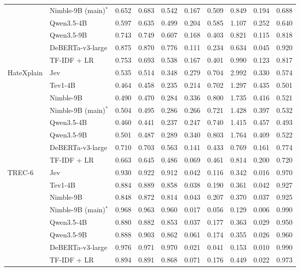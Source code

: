 \begin{tabular}{llrrrrrrrr}
 & Nimble-9B (main)$^\ast$ & 0.652 & 0.683 & 0.542 & 0.167 & 0.509 & 0.849 & 0.194 & 0.688 \\
 & Qwen3.5-4B & 0.597 & 0.635 & 0.499 & 0.204 & 0.585 & 1.107 & 0.252 & 0.640 \\
 & Qwen3.5-9B & 0.743 & 0.749 & 0.607 & 0.168 & 0.403 & 0.821 & 0.115 & 0.818 \\
 & DeBERTa-v3-large & 0.875 & 0.870 & 0.776 & 0.111 & 0.234 & 0.634 & 0.045 & 0.920 \\
 & TF-IDF + LR & 0.753 & 0.693 & 0.538 & 0.167 & 0.401 & 0.990 & 0.123 & 0.817 \\
\midrule
HateXplain & Jev & 0.535 & 0.514 & 0.348 & 0.279 & 0.704 & 2.992 & 0.330 & 0.574 \\
 & Tev1-4B & 0.464 & 0.458 & 0.235 & 0.214 & 0.702 & 1.297 & 0.435 & 0.501 \\
 & Nimble-9B & 0.490 & 0.470 & 0.284 & 0.336 & 0.800 & 1.735 & 0.416 & 0.521 \\
 & Nimble-9B (main)$^\ast$ & 0.504 & 0.495 & 0.286 & 0.266 & 0.721 & 1.428 & 0.397 & 0.532 \\
 & Qwen3.5-4B & 0.460 & 0.441 & 0.237 & 0.247 & 0.740 & 1.415 & 0.457 & 0.493 \\
 & Qwen3.5-9B & 0.501 & 0.487 & 0.289 & 0.340 & 0.803 & 1.764 & 0.409 & 0.522 \\
 & DeBERTa-v3-large & 0.710 & 0.703 & 0.563 & 0.141 & 0.433 & 0.769 & 0.161 & 0.774 \\
 & TF-IDF + LR & 0.663 & 0.645 & 0.486 & 0.069 & 0.461 & 0.814 & 0.200 & 0.720 \\
\midrule
TREC-6 & Jev & 0.930 & 0.922 & 0.912 & 0.042 & 0.116 & 0.342 & 0.016 & 0.970 \\
 & Tev1-4B & 0.884 & 0.889 & 0.858 & 0.038 & 0.190 & 0.361 & 0.042 & 0.927 \\
 & Nimble-9B & 0.848 & 0.872 & 0.814 & 0.043 & 0.207 & 0.370 & 0.037 & 0.925 \\
 & Nimble-9B (main)$^\ast$ & 0.968 & 0.963 & 0.960 & 0.017 & 0.056 & 0.129 & 0.006 & 0.990 \\
 & Qwen3.5-4B & 0.880 & 0.882 & 0.853 & 0.037 & 0.177 & 0.363 & 0.029 & 0.950 \\
 & Qwen3.5-9B & 0.888 & 0.903 & 0.862 & 0.061 & 0.174 & 0.355 & 0.026 & 0.960 \\
 & DeBERTa-v3-large & 0.976 & 0.971 & 0.970 & 0.021 & 0.041 & 0.153 & 0.010 & 0.990 \\
 & TF-IDF + LR & 0.894 & 0.891 & 0.868 & 0.071 & 0.176 & 0.449 & 0.022 & 0.973 \\
\bottomrule
\end{tabular}
